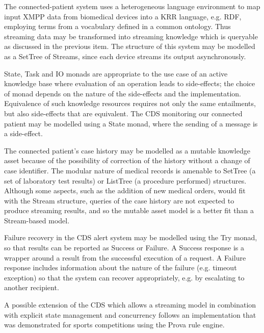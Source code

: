 \documentclass[runningheads]{llncs}
\begin{document}

The connected-patient system uses a heterogeneous language environment to map input XMPP data from biomedical devices into a KRR language, e.g. RDF, employing terms from a vocabulary defined in a common ontology. Thus streaming data may be transformed into streaming knowledge which is queryable as discussed in the previous item. The structure of this system may be modelled as a SetTree of Streams, since each device streams its output asynchronously.

State, Task and IO monads are appropriate to the use case of an active knowledge base where evaluation of an operation leads to side-effects; the choice of monad depends on the nature of the side-effects and the implementation.
Equivalence of such knowledge resources requires not only the same entailments, but also side-effects that are  equivalent.
The CDS monitoring our connected patient may be modelled using a State monad, where the sending of a message is a side-effect.

The connected patient's case history may be modelled as a mutable knowledge asset  because of the possibility of correction of the history without a change of case identifier. The modular nature of medical records is amenable to SetTree (a set of laboratory test results) or ListTree (a procedure performed) structures. Although some aspects, such as the addition of new medical orders, would fit with the Stream structure, queries of the case history are not expected to produce streaming results, and so the mutable asset model is a better fit than a Stream-based model.

Failure recovery in the CDS alert system may be modelled using the Try monad, so that results can be reported as Success or Failure. A Success response is a wrapper around a result from the successful execution of a request. A Failure response includes information about the nature of the failure (e.g. timeout exception) so that the system can recover appropriately, e.g. by escalating to another recipient.

A possible extension of the CDS which allows a streaming model in combination with explicit state management and concurrency follows an implementation\cite{JefferyKP09} that was demonstrated for sports competitions using the Prova rule engine\cite{Prova2012}. 
\end{document}
